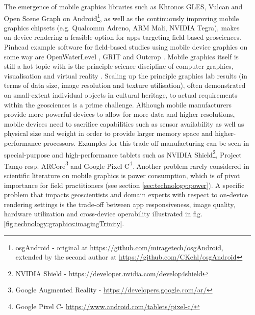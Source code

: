 \documentclass[review]{elsarticle}
\begin{document}
The emergence of mobile graphics libraries such as Khronos \gls{GLES}, Vulcan and Open Scene Graph on Android\footnote{osgAndroid - original at \url{https://github.com/miragetech/osgAndroid}, extended by the second author at \url{https://github.com/CKehl/osgAndroid}}, as well as the continuously improving mobile graphics chipsets (e.g. Qualcomm Adreno, ARM Mali, NVIDIA Tegra), makes on-device rendering a feasible option for apps targeting field-based geosciences. Pinhead example software for field-based studies using mobile device graphics on some way are OpenWaterLevel \cite{Kroehnert2017a}, \gls{GRIT} \cite{Kehl2016_VGCabstract} and Outcrop \cite{Viseur2014_VGCabstract}. Mobile graphics itself is still a hot topic with is the principle science discipline of computer graphics, visualisation and virtual reality \cite{Rodriguez2012,Rodriguez2014,Garcia2015,Agus2017}. Scaling up the principle graphics lab results (in terms of data size, image resolution and texture utilisation), often demonstrated on small-extent individual objects in cultural heritage, to actual requirements within the geosciences is a prime challenge. Although mobile manufacturers provide more powerful devices to allow for more data and higher resolutions, mobile devices need to sacrifice capabilities such as sensor availability as well as physical size and weight in order to provide larger memory space and higher-performance processors. Examples for this trade-off manufacturing can be seen in special-purpose and high-performance tablets such as NVIDIA Shield\footnote{NVIDIA Shield - \url{https://developer.nvidia.com/develop4shield}}, Project Tango resp. ARCore\footnote{Google Augmented Reality - \url{https://developers.google.com/ar/}} and Google Pixel C\footnote{Google Pixel C- \url{https://www.android.com/tablets/pixel-c/}}. Another problem rarely considered in scientific literature on mobile graphics is power consumption, which is of pivot importance for field practitioners (see section \ref{sec:technology:power}). A specific problem that impacts geoscientists and domain experts with respect to on-device rendering settings is the trade-off between app responsiveness, image quality, hardware utilization and cross-device operability illustrated in fig. \ref{fig:technology:graphics:imagingTrinity}.
\end{document}
